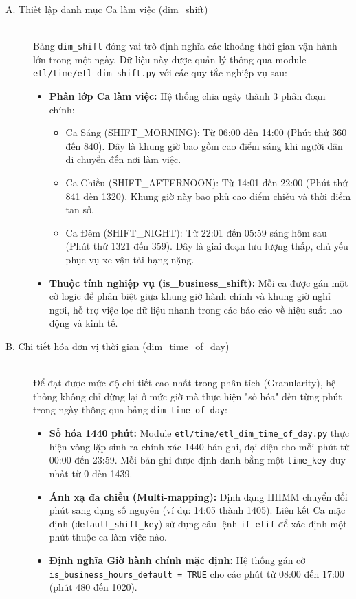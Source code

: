 \begin{description}
    \item[A. Thiết lập danh mục Ca làm việc (dim\_shift)] \hfill \\
    Bảng \texttt{dim\_shift} đóng vai trò định nghĩa các khoảng thời gian vận hành lớn trong một ngày. Dữ liệu này được quản lý thông qua module \texttt{etl/time/etl\_dim\_shift.py} với các quy tắc nghiệp vụ sau:
    \begin{itemize}
        \item \textbf{Phân lớp Ca làm việc:} Hệ thống chia ngày thành 3 phân đoạn chính:
        \begin{itemize}
            \item Ca Sáng (SHIFT\_MORNING): Từ 06:00 đến 14:00 (Phút thứ 360 đến 840). Đây là khung giờ bao gồm cao điểm sáng khi người dân di chuyển đến nơi làm việc.
            \item Ca Chiều (SHIFT\_AFTERNOON): Từ 14:01 đến 22:00 (Phút thứ 841 đến 1320). Khung giờ này bao phủ cao điểm chiều và thời điểm tan sở.
            \item Ca Đêm (SHIFT\_NIGHT): Từ 22:01 đến 05:59 sáng hôm sau (Phút thứ 1321 đến 359). Đây là giai đoạn lưu lượng thấp, chủ yếu phục vụ xe vận tải hạng nặng.
        \end{itemize}
        \item \textbf{Thuộc tính nghiệp vụ (is\_business\_shift):} Mỗi ca được gán một cờ logic để phân biệt giữa khung giờ hành chính và khung giờ nghỉ ngơi, hỗ trợ việc lọc dữ liệu nhanh trong các báo cáo về hiệu suất lao động và kinh tế.
    \end{itemize}

    \item[B. Chi tiết hóa đơn vị thời gian (dim\_time\_of\_day)] \hfill \\
    Để đạt được mức độ chi tiết cao nhất trong phân tích (Granularity), hệ thống không chỉ dừng lại ở mức giờ mà thực hiện "số hóa" đến từng phút trong ngày thông qua bảng \texttt{dim\_time\_of\_day}:
    \begin{itemize}
        \item \textbf{Số hóa 1440 phút:} Module \texttt{etl/time/etl\_dim\_time\_of\_day.py} thực hiện vòng lặp sinh ra chính xác 1440 bản ghi, đại diện cho mỗi phút từ 00:00 đến 23:59. Mỗi bản ghi được định danh bằng một \texttt{time\_key} duy nhất từ 0 đến 1439.
        \item \textbf{Ánh xạ đa chiều (Multi-mapping):} Định dạng HHMM chuyển đổi phút sang dạng số nguyên (ví dụ: 14:05 thành 1405). Liên kết Ca mặc định (\texttt{default\_shift\_key}) sử dụng câu lệnh \texttt{if-elif} để xác định một phút thuộc ca làm việc nào.
        \item \textbf{Định nghĩa Giờ hành chính mặc định:} Hệ thống gán cờ \texttt{is\_business\_hours\_default = TRUE} cho các phút từ 08:00 đến 17:00 (phút 480 đến 1020).
    \end{itemize}


\end{description}
